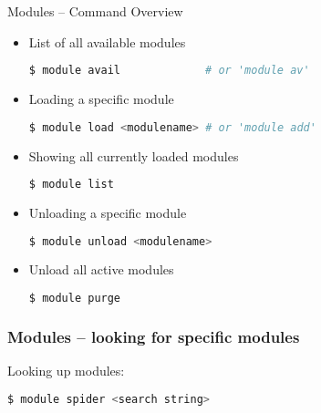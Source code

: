\begin{frame}[fragile]
  {Modules -- Command Overview}
  \vspace{-1em}
  \begin{itemize}
    \setlength\itemsep{-0.1em}
  \item List of all available modules
    \begin{lstlisting}[language=Bash, style=Shell]
$ module avail             # or 'module av'
    \end{lstlisting}
  \item Loading a specific module
    \begin{lstlisting}[language=Bash, style=Shell]
$ module load <modulename> # or 'module add'
    \end{lstlisting}
  \item Showing all currently loaded modules
    \begin{lstlisting}[language=Bash, style=Shell]
$ module list
    \end{lstlisting}
  \item Unloading a specific module
    \begin{lstlisting}[language=Bash, style=Shell]
$ module unload <modulename>
    \end{lstlisting}
  \item Unload all active modules
    \begin{lstlisting}[language=Bash, style=Shell]
$ module purge
    \end{lstlisting}
  \end{itemize}
  \vfill
\end{frame}

\begin{frame}[fragile]
  \frametitle{Modules -- looking for specific modules}
  Looking up modules:
  \begin{lstlisting}[language=Bash, style=Shell]
$ module spider <search string>
  \end{lstlisting}
  \pause
\end{frame}

